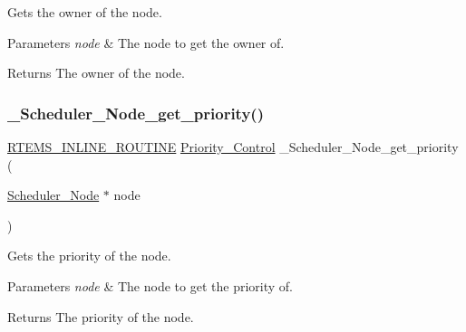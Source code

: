 Gets the owner of the node. 


\begin{DoxyParams}{Parameters}
{\em node} & The node to get the owner of.\\
\hline
\end{DoxyParams}
\begin{DoxyReturn}{Returns}
The owner of the node. 
\end{DoxyReturn}
\mbox{\label{group__RTEMSScoreScheduler_gaefec9c3ea8b8a7a2090d982af594f414}} 
\subsubsection{\texorpdfstring{\_Scheduler\_Node\_get\_priority()}{\_Scheduler\_Node\_get\_priority()}}
{\footnotesize\ttfamily \mbox{\hyperlink{group__RTEMSScoreBaseDefs_gac216239df231d5dbd15e3520b0b9313f}{R\+T\+E\+M\+S\+\_\+\+I\+N\+L\+I\+N\+E\+\_\+\+R\+O\+U\+T\+I\+NE}} \mbox{\hyperlink{group__RTEMSScorePriority_ga59d02b58072d31a9a1cfe644557aefe2}{Priority\+\_\+\+Control}} \+\_\+\+Scheduler\+\_\+\+Node\+\_\+get\+\_\+priority (\begin{DoxyParamCaption}\item[{\mbox{\hyperlink{structScheduler__Node}{Scheduler\+\_\+\+Node}} $\ast$}]{node }\end{DoxyParamCaption})}



Gets the priority of the node. 


\begin{DoxyParams}{Parameters}
{\em node} & The node to get the priority of.\\
\hline
\end{DoxyParams}
\begin{DoxyReturn}{Returns}
The priority of the node. 
\end{DoxyReturn}
\mbox{\label{group__RTEMSScoreScheduler_ga5098a62702f588f64b5944aef720017d}} 
